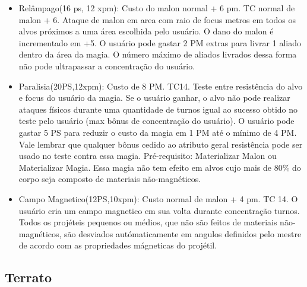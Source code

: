 \begin{itemize}
	\item Relâmpago(16 ps, 12 xpm): Custo do malon normal + 6 pm. TC normal de malon + 6.\newline
Ataque de malon em area com raio de focus metros em todos os alvos próximos a uma área escolhida pelo usuário. O dano do malon é incrementado em +5. O usuário pode gastar 2 PM extras para livrar 1 aliado dentro da área da magia. O número máximo de aliados livrados dessa forma não pode ultrapassar a concentração do usuário.

	\item Paralisia(20PS,12xpm): Custo de 8 PM. TC14.\newline
Teste entre resistência do alvo e focus do usuário da magia. Se o usuário ganhar, o alvo não pode realizar ataques físicos durante uma quantidade de turnos igual ao sucesso obtido no teste pelo usuário  (max bônus de concentração do usuário). O usuário pode gastar 5 PS para reduzir o custo da magia em 1 PM até o mínimo de 4 PM. Vale lembrar que qualquer bônus cedido ao atributo geral resistência pode ser usado no teste contra essa magia. Pré-requisito: Materializar Malon ou Materializar Magia. Essa magia não tem efeito em alvos cujo mais de 80\% do corpo seja composto de materiais não-magnéticos. 

	\item Campo Magnetico(12PS,10xpm): Custo normal de malon + 4 pm. TC 14.\newline
O usuário cria um campo magnetico em sua volta durante concentração turnos. Todos os projéteis pequenos ou médios, que não são feitos de materiais não-magnéticos, são desviados autómaticamente em angulos definidos pelo mestre de acordo com as propriedades mágneticas do projétil. 

\end{itemize}

\subsection{Terrato}

